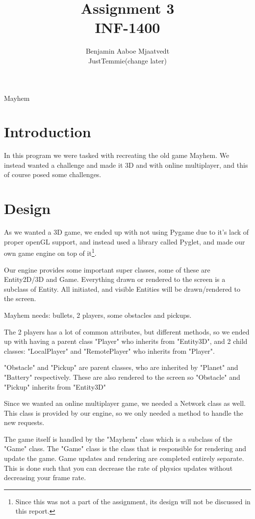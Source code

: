 \documentclass[journal]{IEEEtran}
\begin{document}
\title{Assignment 3\\ INF-1400}

\author{Benjamin Aaboe Mjaatvedt\\ JustTemmie(change later)}
%
{Mayhem}


\maketitle

\section{Introduction} \label{Section:Introduction}
In this program we were tasked with recreating the old game Mayhem. We instead wanted a challenge and made it 3D and with online multiplayer, and this of course posed some challenges.
\section{Design}\label{Section:Design}
As we wanted a 3D game, we ended up with not using Pygame due to it's lack of proper openGL support, and instead used a library called Pyglet, and made our own game engine on top of it\footnote{Since this was not a part of the assignment, its design will not be discussed in this report.}.

Our engine provides some important super classes, some of these are Entity2D/3D and Game. Everything drawn or rendered to the screen is a subclass of Entity. All initiated, and visible Entities will be drawn/rendered to the screen. 

Mayhem needs: bullets, 2 players, some obstacles and pickups.

The 2 players has a lot of common attributes, but different methods, so we ended up with having a parent class "Player" who inherits from "Entity3D", and 2 child classes: "LocalPlayer" and "RemotePlayer" who inherits from "Player".

"Obstacle" and "Pickup" are parent classes, who are inherited by "Planet" and "Battery" respectively. These are also rendered to the screen so "Obstacle" and "Pickup" inherits from "Entity3D"

Since we wanted an online multiplayer game, we needed a Network class as well. This class is provided by our engine, so we only needed a method to handle the new requests.

The game itself is handled by the "Mayhem" class which is a subclass of the "Game" class. The "Game" class is the class that is responsible for rendering and update the game. Game updates and rendering are completed entirely separate. This is done such that you can decrease the rate of physics updates without decreasing your frame rate.
\end{document}
